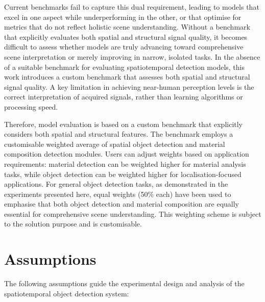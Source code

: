 \documentclass[12pt,a4paper,oneside]{report}
\let\oldsection\section
\renewcommand{\section}{\clearpage\oldsection}
\begin{document}
Current benchmarks fail to capture this dual requirement, leading to models that excel in one aspect while underperforming in the other, or that optimise for metrics that do not reflect holistic scene understanding. Without a benchmark that explicitly evaluates both spatial and structural signal quality, it becomes difficult to assess whether models are truly advancing toward comprehensive scene interpretation or merely improving in narrow, isolated tasks. In the absence of a suitable benchmark for evaluating spatiotemporal detection models, this work introduces a custom benchmark that assesses both spatial and structural signal quality. A key limitation in achieving near-human perception levels is the correct interpretation of acquired signals, rather than learning algorithms or processing speed.

Therefore, model evaluation is based on a custom benchmark that explicitly considers both spatial and structural features. The benchmark employs a customisable weighted average of spatial object detection and material composition detection modules. Users can adjust weights based on application requirements: material detection can be weighted higher for material analysis tasks, while object detection can be weighted higher for localisation-focused applications. For general object detection tasks, as demonstrated in the experiments presented here, equal weights (50\% each) have been used to emphasise that both object detection and material composition are equally essential for comprehensive scene understanding. This weighting scheme is subject to the solution purpose and is customisable.


\newpage
\section{Assumptions}
\label{sec:assumptions}

The following assumptions guide the experimental design and analysis of the spatiotemporal object detection system:
\end{document}
